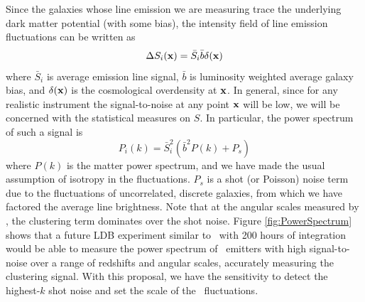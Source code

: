 Since the galaxies whose line emission we are measuring trace the
underlying dark matter potential (with some bias), the intensity field
of line emission fluctuations can be written as
\begin{equation}
\Delta S_i(\mathbf{x}) = \bar{S}_i \bar{b} \delta(\mathbf{x})
\end{equation}
where $\bar{S}_i$ is average emission line signal, $\bar{b}$ is
luminosity weighted average galaxy bias, and $\delta(\mathbf{x})$ is the
cosmological overdensity at $\mathbf{x}$.  In general, since for any
realistic instrument the signal-to-noise at any point $\mathbf{x}$ will
be low, we will be concerned with the statistical measures on $S$.  In
particular, the power spectrum
of such a signal is
\begin{equation}
P_i(k) = \bar{S}_i^2 (\bar{b}^2 P(k) + P_s)
\end{equation}
where $P(k)$ is the matter power spectrum, and we have made the usual
assumption of isotropy in the fluctuations.  $P_s$ is a shot (or
Poisson) noise term due to the fluctuations of uncorrelated, discrete
galaxies, from which we have factored the average line brightness.
Note that at the angular scales measured by \name, the clustering
term dominates over the shot noise.  Figure \ref{fig:PowerSpectrum}
shows that a future LDB experiment similar to \name\ with 200 hours of integration would be able to measure the power spectrum of \cii\ emitters with high
signal-to-noise over a range of redshifts and angular scales,
accurately measuring the clustering signal.  With this proposal, we have the sensitivity to detect the highest-$k$ shot noise and set the scale of the \cii\ fluctuations.

